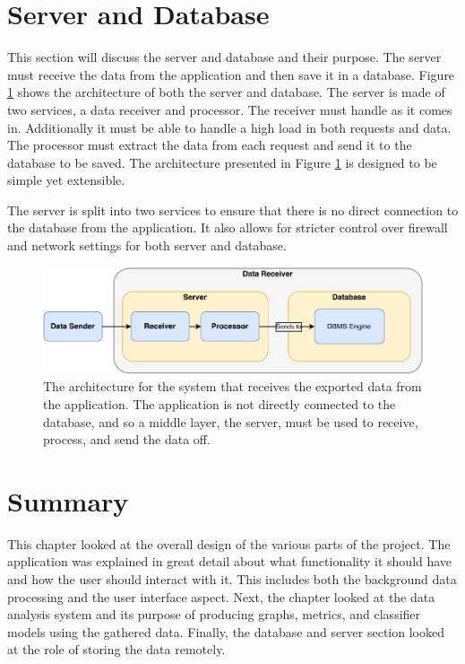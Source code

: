 \documentclass{l4proj}
\begin{document}
\section{Server and Database}
This section will discuss the server and database and their purpose. The server must receive the data from the application and then save it in a database. Figure \ref{fig:server_diagram} shows the architecture of both the server and database. The server is made of two services, a data receiver and processor. The receiver must handle as it comes in. Additionally it must be able to handle a high load in both requests and data. The processor must extract the data from each request and send it to the database to be saved. The architecture presented in Figure \ref{fig:server_diagram} is designed to be simple yet extensible.

The server is split into two services to ensure that there is no direct connection to the database from the application. It also allows for stricter control over firewall and network settings for both server and database.

\begin{figure}[htb]
    \centering
    \includegraphics[width=0.80\linewidth]{images/server_diagram.pdf}    
    \caption{The architecture for the system that receives the exported data from the application. The application is not directly connected to the database, and so a middle layer, the server, must be used to receive, process, and send the data off.}
    \label{fig:server_diagram} 
\end{figure}


\section{Summary}
This chapter looked at the overall design of the various parts of the project. The application was explained in great detail about what functionality it should have and how the user should interact with it. This includes both the background data processing and the user interface aspect. Next, the chapter looked at the data analysis system and its purpose of producing graphs, metrics, and classifier models using the gathered data. Finally, the database and server section looked at the role of storing the data remotely.
\end{document}
